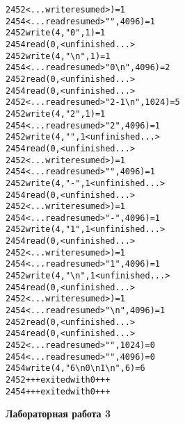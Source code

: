 \documentclass[pdf, unicode, 12pt, a4paper,oneside,fleqn]{article}
\begin{document}
\begin{alltt}
2452  <... write resumed>)              = 1
2454  <... read resumed>" ", 4096)      = 1
2452  write(4, "0", 1)                  = 1
2454  read(0,  <unfinished ...>
2452  write(4, "\textbackslash{n}", 1)                 = 1
2454  <... read resumed>"0\textbackslash{n}", 4096)    = 2
2452  read(0,  <unfinished ...>
2454  read(0,  <unfinished ...>
2452  <... read resumed>"2 -1\textbackslash{n}", 1024) = 5
2452  write(4, "2", 1)                  = 1
2454  <... read resumed>"2", 4096)      = 1
2452  write(4, " ", 1 <unfinished ...>
2454  read(0,  <unfinished ...>
2452  <... write resumed>)              = 1
2454  <... read resumed>" ", 4096)      = 1
2452  write(4, "-", 1 <unfinished ...>
2454  read(0,  <unfinished ...>
2452  <... write resumed>)              = 1
2454  <... read resumed>"-", 4096)      = 1
2452  write(4, "1", 1 <unfinished ...>
2454  read(0,  <unfinished ...>
2452  <... write resumed>)              = 1
2454  <... read resumed>"1", 4096)      = 1
2452  write(4, "\textbackslash{n}", 1 <unfinished ...>
2454  read(0,  <unfinished ...>
2452  <... write resumed>)              = 1
2454  <... read resumed>"\textbackslash{n}", 4096)     = 1
2452  read(0,  <unfinished ...>
2454  read(0,  <unfinished ...>
2452  <... read resumed>"", 1024)       = 0
2454  <... read resumed>"", 4096)       = 0
2454  write(4, "6\textbackslash{n}0\textbackslash{n}1\textbackslash{n}", 6)          = 6
2452  +++ exited with 0 +++
2454  +++ exited with 0 +++
\end{alltt}

\pagebreak

{\large\textbf{Лабораторная работа 3}}
\end{document}
